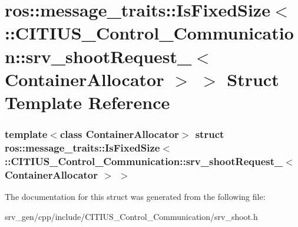 \hypertarget{structros_1_1message__traits_1_1_is_fixed_size_3_01_1_1_c_i_t_i_u_s___control___communication_1_321403ae8769d4354f3c80302b859f69}{\section{ros\-:\-:message\-\_\-traits\-:\-:\-Is\-Fixed\-Size$<$ \-:\-:\-C\-I\-T\-I\-U\-S\-\_\-\-Control\-\_\-\-Communication\-:\-:srv\-\_\-shoot\-Request\-\_\-$<$ \-Container\-Allocator $>$ $>$ \-Struct \-Template \-Reference}
\label{structros_1_1message__traits_1_1_is_fixed_size_3_01_1_1_c_i_t_i_u_s___control___communication_1_321403ae8769d4354f3c80302b859f69}
}
\subsubsection*{template$<$class Container\-Allocator$>$ struct ros\-::message\-\_\-traits\-::\-Is\-Fixed\-Size$<$ \-::\-C\-I\-T\-I\-U\-S\-\_\-\-Control\-\_\-\-Communication\-::srv\-\_\-shoot\-Request\-\_\-$<$ Container\-Allocator $>$ $>$}



\-The documentation for this struct was generated from the following file\-:\begin{DoxyCompactItemize}
\item 
srv\-\_\-gen/cpp/include/\-C\-I\-T\-I\-U\-S\-\_\-\-Control\-\_\-\-Communication/srv\-\_\-shoot.\-h\end{DoxyCompactItemize}
